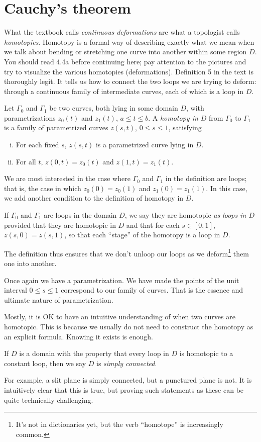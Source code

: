 \documentclass[twocolumn,12pt]{article}
\begin{document}
\section{Cauchy's theorem}
What the textbook calls \emph{continuous deformations} are what a topologist calls \emph{homotopies}. Homotopy is a formal way of describing exactly what we mean when we talk about bending or stretching one curve into another within some region $D$. You should read 4.4a before continuing here; pay attention to the pictures and try to visualize the various homotopies (deformations). Definition 5 in the text is thoroughly legit. It tells us how to connect the two loops we are trying to deform: through a continuous family of intermediate curves, each of which is a loop in $D$. 
\begin{definition}
    Let $\Gamma_0$ and $\Gamma_1$ be two curves, both lying in some domain $D$, with parametrizations $z_0(t)$ and $z_1(t)$, $a \leq t \leq b$. A \emph{homotopy in $D$} from $\Gamma_0$ to $\Gamma_1$ is a family of parametrized curves $z(s,t)$, $0 \leq s \leq 1$, satisfying
    \begin{enumerate}[(i)]
        \item For each fixed $s$, $z(s,t)$ is a parametrized curve lying in $D$.
        \item For all $t$, $z(0,t) = z_0(t)$ and $z(1,t) = z_1(t)$.
    \end{enumerate}
\end{definition}
We are most interested in the case where $\Gamma_0$ and $\Gamma_1$ in the definition are loops; that is, the case in which $z_0(0) = z_0(1)$ and $z_1(0) = z_1(1)$. In this case, we add another condition to the definition of homotopy in $D$.
\begin{definition}
    If $\Gamma_0$ and $\Gamma_1$ are loops in the domain $D$, we say they are homotopic \emph{as loops in $D$} provided that they are homotopic in $D$ and that for each $s \in [0,1]$, $z(s,0) = z(s,1)$, so that each ``stage''  of the homotopy is a loop in $D$.
\end{definition}
The definition thus ensures that we don't unloop our loops as we deform\footnote{It's not in dictionaries yet, but the verb ``homotope'' is increasingly common.} them one into another.

Once again we have a parametrization. We have made the points of the unit interval $0 \leq s \leq 1$ correspond to our family of curves. That is the essence and ultimate nature of parametrization. 

Mostly, it is OK to have an intuitive understanding of when two curves are homotopic. This is because we usually do not need to construct the homotopy as an explicit formula. Knowing it exists is enough.
\begin{definition}
    If $D$ is a domain with the property that every loop in $D$ is homotopic  to a constant loop, then we say $D$ is \emph{simply connected}.
\end{definition}
For example, a slit plane is simply connected, but a punctured plane is not. It is intuitively clear that this is true, but proving such statements as these can be quite technically challenging. 
\end{document}
